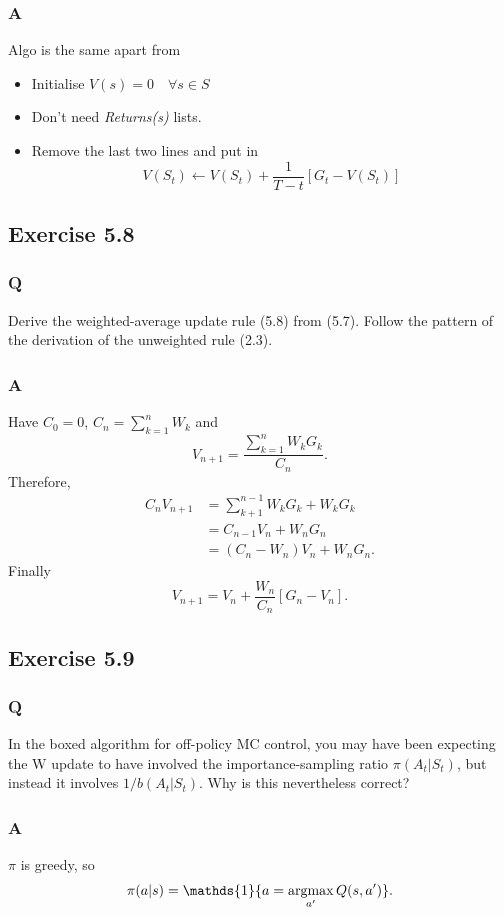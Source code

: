 \subsubsection{A}
Algo is the same apart from 
\begin{itemize}
    \item Initialise $V(s) = 0 \quad \forall s \in S$
    \item Don't need \emph{Returns(s)} lists.
    \item Remove the last two lines and put in \[ V(S_t) \leftarrow V(S_t) + \frac{1}{T- t}[ G_t - V(S_t) ] \]
\end{itemize}

\subsection{Exercise 5.8}
\subsubsection{Q}
Derive the weighted-average update rule (5.8) from (5.7). Follow the pattern of the derivation of the unweighted rule (2.3).

\subsubsection{A}
Have $C_0 = 0$, $C_n = \sum_{k = 1}^n W_k$ and 
\[
    V_{n+1} = \frac{\sum_{k = 1}^n W_kG_k}{C_n}.
\]
Therefore,
\begin{align}
    C_n V_{n+1} &= \sum_{k+1}^{n-1}W_kG_k + W_kG_k\\
                &= C_{n-1}V_n + W_nG_n \\
                &= (C_n - W_n)V_n + W_nG_n.
\end{align}
Finally
\[
    V_{n+1} = V_n + \frac{W_n}{C_n}[G_n - V_n].
\]

\subsection{Exercise 5.9}
\subsubsection{Q}
In the boxed algorithm for off-policy MC control, you may have been expecting the W update to have involved the importance-sampling ratio $\pi(A_t|S_t)$, but instead it involves $1/b(A_t|S_t)$. Why is this nevertheless correct?

\subsubsection{A}
$\pi$ is greedy, so 
\[
    \pi(a | s) = \mathds{1}\{a = \argmax_{a'} Q(s, a')\}.
\]

